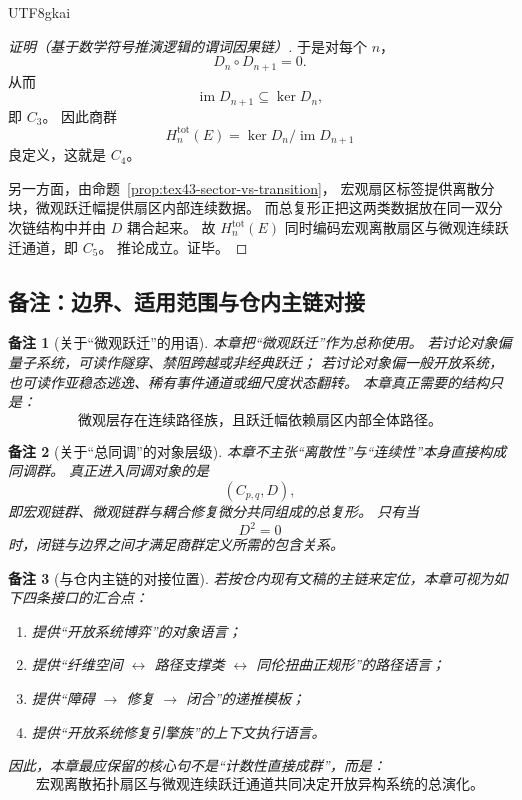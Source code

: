 \documentclass[12pt]{article}
\newtheorem{remark}{备注}[section]
\newcommand{\Img}{\operatorname{im}}
\newcommand{\Ker}{\operatorname{ker}}
\begin{document}
\begin{CJK*}{UTF8}{gkai}
\begin{proof}[证明（基于数学符号推演逻辑的谓词因果链）]
于是对每个 $n$，
\[
  D_n\circ D_{n+1}=0.
\]
从而
\[
  \Img D_{n+1}\subseteq \Ker D_n,
\]
即 $C_3$。
因此商群
\[
  H_n^{\mathrm{tot}}(E)=\Ker D_n/\Img D_{n+1}
\]
良定义，这就是 $C_4$。

另一方面，由命题~\ref{prop:tex43-sector-vs-transition}，
宏观扇区标签提供离散分块，微观跃迁幅提供扇区内部连续数据。
而总复形正把这两类数据放在同一双分次链结构中并由 $D$ 耦合起来。
故 $H_n^{\mathrm{tot}}(E)$ 同时编码宏观离散扇区与微观连续跃迁通道，即 $C_5$。
推论成立。证毕。
\end{proof}

\subsection{备注：边界、适用范围与仓内主链对接}
\label{subsec:tex43-remarks}

\begin{remark}[关于“微观跃迁”的用语]
本章把“微观跃迁”作为总称使用。
若讨论对象偏量子系统，可读作隧穿、禁阻跨越或非经典跃迁；
若讨论对象偏一般开放系统，也可读作亚稳态逃逸、稀有事件通道或细尺度状态翻转。
本章真正需要的结构只是：
\[
  \text{微观层存在连续路径族，且跃迁幅依赖扇区内部全体路径。}
\]
\end{remark}

\begin{remark}[关于“总同调”的对象层级]
本章不主张“离散性”与“连续性”本身直接构成同调群。
真正进入同调对象的是
\[
  (C_{p,q},D),
\]
即宏观链群、微观链群与耦合修复微分共同组成的总复形。
只有当
\[
  D^2=0
\]
时，闭链与边界之间才满足商群定义所需的包含关系。
\end{remark}

\begin{remark}[与仓内主链的对接位置]
若按仓内现有文稿的主链来定位，本章可视为如下四条接口的汇合点：
\begin{enumerate}
  \item \cite{RepoTex23OpenSystemGame} 提供“开放系统博弈”的对象语言；
  \item \cite{RepoTex36HomotopyTwistBijection} 提供“纤维空间 $\leftrightarrow$ 路径支撑类 $\leftrightarrow$ 同伦扭曲正规形”的路径语言；
  \item \cite{RepoTex38JacobiBianchiRepair} 提供“障碍 $\to$ 修复 $\to$ 闭合”的递推模板；
  \item \cite{RepoTex39StatRepair} 提供“开放系统修复引擎族”的上下文执行语言。
\end{enumerate}
因此，本章最应保留的核心句不是“计数性直接成群”，而是：
\[
  \boxed{
    \text{宏观离散拓扑扇区与微观连续跃迁通道共同决定开放异构系统的总演化。}
  }
\]
\end{remark}


\end{CJK*}
\end{document}
